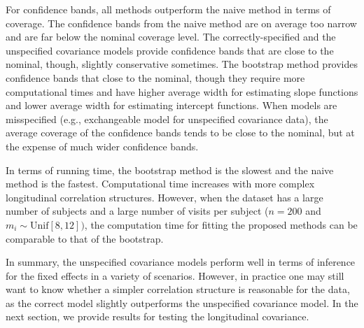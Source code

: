 \documentclass[submit]{smj}
\begin{document}
For confidence bands, all  methods outperform the naive method in terms of coverage. The confidence bands from the naive method are on average too narrow and are far below the nominal coverage level. The correctly-specified and the unspecified covariance models provide confidence bands that are close to the nominal, though,  slightly conservative sometimes. The bootstrap method  provides confidence bands that close to the nominal, though they require more computational times and have  higher average width for estimating slope functions and lower average width for estimating intercept functions. When models are misspecified (e.g., exchangeable model for unspecified covariance data), the average coverage of the confidence bands tends to be close to the nominal, but at the expense of much wider confidence bands.


In terms of running time, the bootstrap method is the slowest and the naive method is the fastest. Computational time increases with more complex longitudinal correlation structures. However, when the dataset has a large number of subjects and a large number of visits per subject ($n=200$ and $m_i\sim \text{Unif}[8,12])$, the computation time for fitting the proposed methods can be comparable to that of the bootstrap. 

In summary, the unspecified covariance models perform well in terms of inference for the fixed effects in a variety of scenarios. However, in practice one may still want to know whether a simpler correlation structure is reasonable for the data, as the correct model slightly outperforms the unspecified covariance model. In the next section, we provide results for testing the longitudinal covariance.
\end{document}
